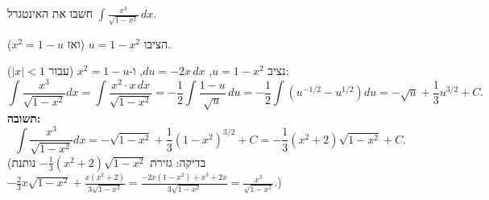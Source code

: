 
\begin{question}
חשבו את האינטגרל $\displaystyle\int\frac{x^3}{\sqrt{1-x^2}}\,dx$.
\end{question}

\begin{hint}
הציבו $u=1-x^2$ (ואז $x^2=1-u$).
\end{hint}

\begin{solution}
נציב $u=1-x^2$, $du=-2x\,dx$, ו-$x^2=1-u$ (עבור $|x|<1$):
\[
\int\frac{x^3}{\sqrt{1-x^2}}dx=\int\frac{x^2\cdot x\,dx}{\sqrt{1-x^2}}=-\frac12\int\frac{1-u}{\sqrt u}\,du=-\frac12\int\left(u^{-1/2}-u^{1/2}\right)du
=-\sqrt u+\frac13u^{3/2}+C.
\]
\textbf{תשובה:}
\[
\int\frac{x^3}{\sqrt{1-x^2}}dx=-\sqrt{1-x^2}+\frac13(1-x^2)^{3/2}+C=-\frac13(x^2+2)\sqrt{1-x^2}+C.
\]
(בדיקה: גזירת $-\frac13(x^2+2)\sqrt{1-x^2}$ נותנת $-\frac23x\sqrt{1-x^2}+\frac{x(x^2+2)}{3\sqrt{1-x^2}}=\frac{-2x(1-x^2)+x^3+2x}{3\sqrt{1-x^2}}=\frac{x^3}{\sqrt{1-x^2}}$.)
\end{solution}
